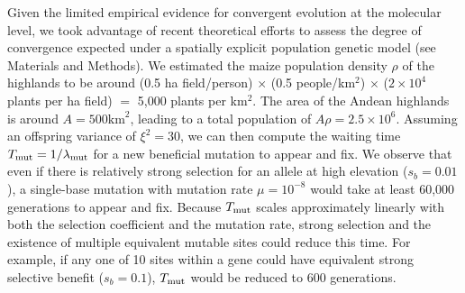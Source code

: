 Given the limited empirical evidence for convergent evolution at the molecular level, we took advantage of recent theoretical efforts \cite[]{ralph2014convergent} to assess the degree of convergence expected under a spatially explicit population genetic model (see Materials and Methods).
We estimated the maize population density $\rho$ of the highlands to be around (0.5 ha field/person) $\times$ (0.5 people/km$^2$) $\times$ ($2\times 10^4$ plants per ha field) $=$ 5,000 plants per km$^2$.
The area of the Andean highlands is around $A=500\text{km}^2$, leading to a total population of $A \rho = 2.5 \times 10^6$. 
Assuming an offspring variance of $\xi^2 = 30$, we can then compute the waiting time $T_{\text{mut}}=1/\lambda_{\text{mut}}$ for a new beneficial mutation to appear and fix.
We observe that even if there is relatively strong selection for an allele at high elevation ($s_b=0.01$), a single-base mutation with mutation rate $\mu=10^{-8}$ would take at least 60,000 generations to appear and fix.
Because $T_{\text{mut}}$ scales approximately linearly with both the selection coefficient and the mutation rate, strong selection and the existence of multiple equivalent mutable sites could reduce this time. 
For example, if any one of 10 sites within a gene could have equivalent strong selective benefit ($s_b=0.1$), $T_{\text{mut}}$ would be reduced to 600 generations. 



